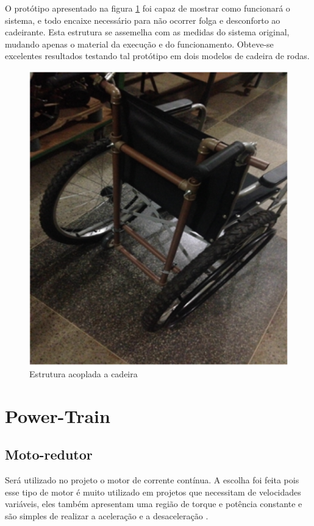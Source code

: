 O protótipo apresentado na figura \ref{fig:estr_prototipo} foi capaz de mostrar como funcionará o sistema, e todo encaixe necessário para não ocorrer folga e desconforto ao cadeirante. Esta estrutura se assemelha com as medidas do sistema original, mudando apenas o material da execução e do funcionamento. Obteve-se excelentes resultados testando tal protótipo em dois modelos de cadeira de rodas. 

\begin{figure}[!htb]
\centering
\includegraphics[keepaspectratio=true,scale=0.4]{figuras/resultados/estr_prototipo}
\caption{Estrutura acoplada a cadeira}
\label{fig:estr_prototipo}
\end{figure}

\section{Power-Train}

\subsection{Moto-redutor}

Será utilizado no projeto o motor de corrente contínua. A escolha foi feita pois esse tipo de motor é muito utilizado em projetos que necessitam de velocidades variáveis, eles também apresentam uma região de torque e potência constante e são simples de realizar a aceleração e a desaceleração \cite{manual_bateria_unipower}.

